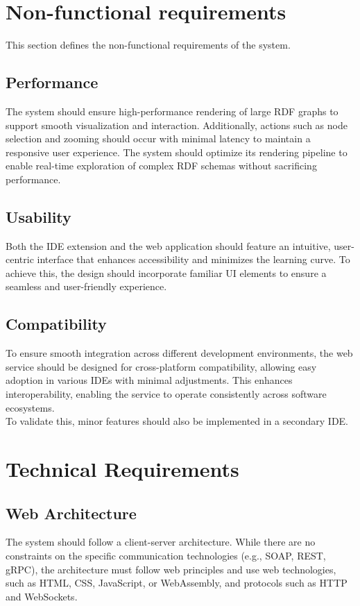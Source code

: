\section{Non-functional requirements\label{sec:techreq}}
This section defines the non-functional requirements of the system.

\subsection{Performance\label{sec:reqsuba}}
The system should ensure high-performance rendering of large RDF graphs to support smooth visualization and interaction. Additionally, actions such as node selection and zooming should occur with minimal latency to maintain a responsive user experience. The system should optimize its rendering pipeline to enable real-time exploration of complex RDF schemas without sacrificing performance.

\subsection{Usability\label{sec:reqsuba}}
Both the IDE extension and the web application should feature an intuitive, user-centric interface that enhances accessibility and minimizes the learning curve. To achieve this, the design should incorporate familiar UI elements to ensure a seamless and user-friendly experience.

\subsection{Compatibility\label{sec:reqsuba}}
To ensure smooth integration across different development environments, the web service should be designed for cross-platform compatibility, allowing easy adoption in various IDEs with minimal adjustments. This enhances interoperability, enabling the service to operate consistently across software ecosystems.
\\
To validate this, minor features should also be implemented in a secondary IDE.

\section{Technical Requirements\label{sec:techreq}}

\subsection{Web Architecture\label{sec:reqsuba}}
The system should follow a client-server architecture. While there are no constraints on the specific communication technologies (e.g., SOAP, REST, gRPC), the architecture must follow web principles and use web technologies, such as HTML, CSS, JavaScript, or WebAssembly, and protocols such as HTTP and WebSockets.

